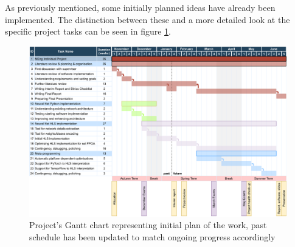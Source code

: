 As previously mentioned, some initially planned ideas have already been implemented. The distinction between these and a more detailed look at the specific project tasks can be seen in figure \ref{fig:gantt-chart}.

\begin{figure}[hpt]
  \centering
  \includegraphics[trim={0cm 0cm 0cm 0cm}, width=1.2\textwidth, center]{project/gantt_chart.pdf}
  \caption{Project's Gantt chart representing initial plan of the work, past schedule has been updated to match ongoing progress accordingly}
  \label{fig:gantt-chart}
\end{figure}

